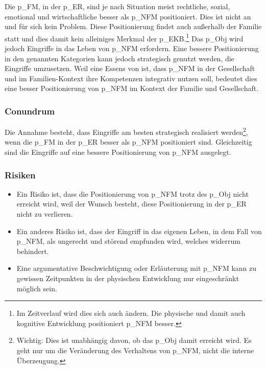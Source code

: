 Die \gls{p_FM}, in der \gls{p_ER}, sind je nach Situation meist rechtliche, sozial, emotional und wirtschaftliche besser als \gls{p_NFM} positioniert. Dies ist nicht an und für sich kein Problem. Diese Positionierung findet auch außerhalb der Familie statt und dies damit kein alleiniges Merkmal der \gls{p_EKB}.\footnote{
	Im Zeitverlauf wird dies sich auch ändern. Die physische und damit auch kognitive Entwicklung positioniert \gls{p_NFM} besser.
}
Das \gls{p_Obj}  wird jedoch Eingriffe in das Leben von \gls{p_NFM} erfordern. Eine bessere Positionierung in den genannten Kategorien kann jedoch strategisch genutzt werden, die Eingriffe umzusetzen. Weil eine Essens von  ist, dass
\gls{p_NFM} in der Gesellschaft und im Familien-Kontext ihre Kompetenzen integrativ nutzen soll, bedeutet dies eine besser Positionierung von \gls{p_NFM} im Kontext der Familie und Gesellschaft.\\
 

\subsubsection{Conundrum} Die Annahme besteht, dass Eingriffe am besten strategisch realisiert werden\footnote{
	Wichtig: Dies ist unabhängig davon, ob das \gls{p_Obj} damit erreicht wird. Es geht nur um die Veränderung des Verhaltens von \gls{p_NFM}, nicht die interne Überzeugung.
}, wenn die \gls{p_FM} in der \gls{p_ER} besser als \gls{p_NFM} positioniert sind. Gleichzeitig sind die Eingriffe auf eine bessere Positionierung von \gls{p_NFM} ausgelegt.\\


\subsubsection{Risiken}
\begin{itemize}
	\item Ein Risiko ist, dass die Positionierung von \gls{p_NFM} trotz des \gls{p_Obj} nicht erreicht wird, weil der Wunsch besteht, diese Positionierung in der \gls{p_ER} nicht zu verlieren. 
	\item Ein anderes Risiko ist, dass der Eingriff in das eigenen Leben, in dem Fall von \gls{p_NFM}, als ungerecht und störend empfunden wird, welches widerrum \NFMOTwo behindert.
	\item Eine argumentative Beschwichtigung oder Erläuterung mit \gls{p_NFM} kann zu gewissen Zeitpunkten in der physischen Entwicklung nur eingeschränkt möglich sein.
\end{itemize}

